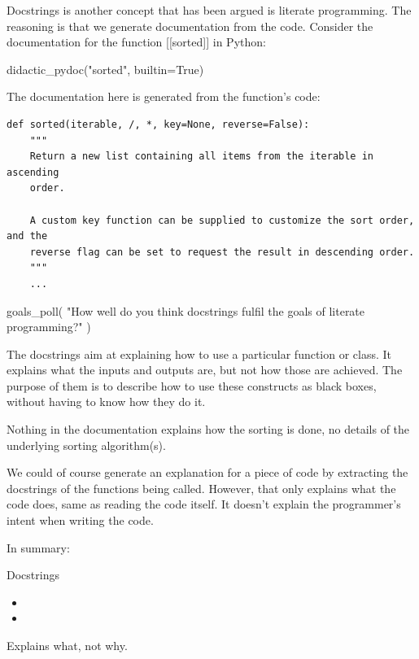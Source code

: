 Docstrings is another concept that has been argued is literate programming.
The reasoning is that we generate documentation from the code.
Consider the documentation for the function [[sorted]]\label{sortedDocExample} 
in Python:
\begin{frame}[fragile]
\begin{pycode}
didactic_pydoc("sorted", builtin=True)
\end{pycode}
\end{frame}
The documentation here is generated from the function's code:
\begin{frame}[fragile]
\begin{verbatim}
def sorted(iterable, /, *, key=None, reverse=False):
    """
    Return a new list containing all items from the iterable in ascending 
    order.

    A custom key function can be supplied to customize the sort order, and the
    reverse flag can be set to request the result in descending order.
    """
    ...
\end{verbatim}
\end{frame}

\begin{frame}[fragile]
\begin{activity}
\begin{pycode}
goals_poll(
    "How well do you think docstrings fulfil the goals of literate programming?"
)
\end{pycode}
\end{activity}
\end{frame}

The docstrings aim at explaining how to use a particular function or class.
It explains what the inputs and outputs are, but not how those are achieved.
The purpose of them is to describe how to use these constructs as black boxes, 
without having to know how they do it.

Nothing in the documentation explains how the sorting is done, no details of 
the underlying sorting algorithm(s).

We could of course generate an explanation for a piece of code by extracting 
the docstrings of the functions being called.
However, that only explains what the code does, same as reading the code 
itself.
It doesn't explain the programmer's intent when writing the code.

In summary:

\begin{frame}
\begin{block}{Docstrings}
  \begin{itemize}
    \item[\(-\)] {\color{red}\LPexplain}
    \item[\(-\)] {\color{red}\LPorder}
  \end{itemize}
\end{block}

\begin{remark}
  Explains what, not why.
\end{remark}
\end{frame}

